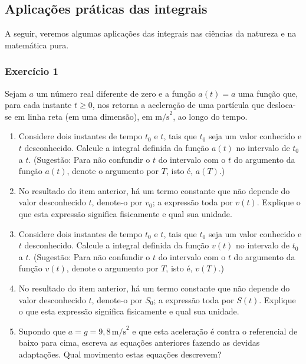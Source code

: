 \documentclass[12pt,openright,twoside,a4paper]{article}
\theoremstyle{definition}
\begin{document}
	
	
	\subsection{Aplicações práticas das integrais}
	
	A seguir, veremos algumas aplicações das integrais nas ciências da natureza e na matemática pura.
	
	
		
		\subsubsection{Exercício 1}
		
		Sejam \( a \) um número real diferente de zero e a função \( a(t) = a \) uma função que, para cada instante \( t \geq 0 \), nos retorna a aceleração de uma partícula que desloca-se em linha reta (em uma dimensão), em \( \text{m/s}^2 \), ao longo do tempo.
		
		\begin{enumerate}
			\item[(a)] Considere dois instantes de tempo \( t_0 \) e \( t \), tais que \( t_0 \) seja um valor conhecido e \( t \) desconhecido. Calcule a integral definida da função \( a(t) \) no intervalo de \( t_0 \) a \( t \). (Sugestão: Para não confundir o \( t \) do intervalo com o \( t \) do argumento da função \( a(t) \), denote o argumento por \( T \), isto é, \( a(T) \).)
			
			\item[(b)] No resultado do item anterior, há um termo constante que não depende do valor desconhecido \( t \), denote-o por \( v_0 \); a expressão toda por \( v(t) \). Explique o que esta expressão significa fisicamente e qual sua unidade.
			
			\item[(c)] Considere dois instantes de tempo \( t_0 \) e \( t \), tais que \( t_0 \) seja um valor conhecido e \( t \) desconhecido. Calcule a integral definida da função \( v(t) \) no intervalo de \( t_0 \) a \( t \). (Sugestão: Para não confundir o \( t \) do intervalo com o \( t \) do argumento da função \( v(t) \), denote o argumento por \( T \), isto é, \( v(T) \).)
			
			\item[(d)] No resultado do item anterior, há um termo constante que não depende do valor desconhecido \( t \), denote-o por \( S_0 \); a expressão toda por \( S(t) \). Explique o que esta expressão significa fisicamente e qual sua unidade.
			
			\item[(e)] Supondo que \( a = g = 9{,}8 \, \text{m/s}^2 \) e que esta aceleração é contra o referencial de baixo para cima, escreva as equações anteriores fazendo as devidas adaptações. Qual movimento estas equações descrevem?
		\end{enumerate}
		
\end{document}
